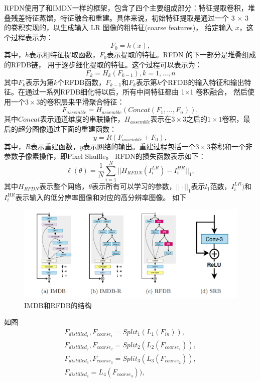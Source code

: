 \documentclass{cjc}
\begin{document}
RFDN使用了和IMDN\cite{imdn}一样的框架，包含了四个主要组成部分：特征提取卷积，堆叠残差特征蒸馏，特征融合和重建。具体来说，初始特征提取是通过一个 3 × 3 的卷积实现的，以生成输入 LR 图像的粗特征(coarse
features)， 给定输入 $x$，这个过程表示为：
\begin{equation}
F_0=h(x),
\end{equation}
其中，$h$表示粗特征提取函数，$F_0$表示提取的特征。RFDN 的下一部分是堆叠组成的RFDB链，
用于逐步细化提取的特征。这个过程可以表示为：
\begin{equation}
F_k=H_k(F_{k-1}),k=1,...,n
\end{equation}
其中$F_k$表示为第$k$个RFDB函数，$F_{k-1}$和$F_k$表示第$k$个RFDB的输入特征和输出特征。在通过一系列RFDB细化特以后，所有中间特征都由 1×1 卷积融合， 然后使用一个$3\times3$的卷积层来平滑聚合特征：
\begin{equation}
F_{assemble}=H_{assemble}(Concat(F_1,...,F_n)),
\end{equation}
其中$Concat$表示通道维度的串联操作，$H_{assemble}$表示在$3\times3$之后的$1\times1$卷积，最后的超分图像通过下面的重建函数：
\begin{equation}
y=R(F_{assemble}+F_0),
\end{equation}
其中，$R$表示重建函数，$y$表示网络的输出。重建过程包括一个$3\times3$卷积和一个非参数子像素操作，即Pixel Shuffle\cite{pixleshuffle}。
RFDN的损失函数表示如下：
\begin{equation}
\ell(\theta)= \frac{1}{N}\sum^N_{i=1}||H_{RFDN}(I_i^{LR})-I_i^{HR}||_1,
\end{equation}
其中$H_{RFDN}$表示整个网络，$\theta$表示所有可以学习的参数，$||\cdot||_1$表示$l_1$范数，$I_i^{LR})$和$I_i^{HR}$表示输入的低分辨率图像和对应的高分辨率图像。
如下
\begin{figure}[htb]
  \centering
  \includegraphics[width=\linewidth]{image/rfdb.png}
  \caption{IMDB和RFDB的结构}
\end{figure}
如图
\begin{equation}
\begin{split}
F_{distilled_1},F_{coarse_1}=Split_1(L_1(F_{in})), \\
F_{distilled_2},F_{coarse_2}=Split_2(L_2(F_{coarse_1})), \\
F_{distilled_3},F_{coarse_3}=Split_3(L_3(F_{coarse_2})), \\
F_{distilled_4}=L_4(F_{coarse_3})), \\
\end{split}
\end{equation}
\end{document}
